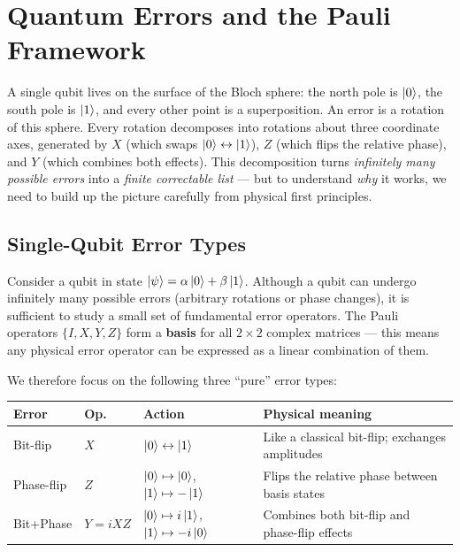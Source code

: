 \documentclass[11pt, a4paper]{article}
\theoremstyle{definition}
\theoremstyle{plain}
\theoremstyle{remark}
\begin{document}
\newpage
\section{Quantum Errors and the Pauli Framework}
\label{sec:errors}

\begin{intuition}
A single qubit lives on the surface of the Bloch sphere: the north pole is
$\ket{0}$, the south pole is $\ket{1}$, and every other point is a
superposition.  An error is a rotation of this sphere.  Every rotation
decomposes into rotations about three coordinate axes, generated by $X$
(which swaps $\ket{0}\leftrightarrow\ket{1}$), $Z$ (which flips the
relative phase), and $Y$ (which combines both effects).  This decomposition
turns \emph{infinitely many possible errors} into a \emph{finite correctable
list} --- but to understand \emph{why} it works, we need to build up the
picture carefully from physical first principles.
\end{intuition}

\subsection{Single-Qubit Error Types}

Consider a qubit in state $\ket{\psi} = \alpha\ket{0} + \beta\ket{1}$.
Although a qubit can undergo infinitely many possible errors (arbitrary
rotations or phase changes), it is sufficient to study a small set of
fundamental error operators.  The Pauli operators $\{I, X, Y, Z\}$ form
a \textbf{basis} for all $2\times2$ complex matrices --- this means any
physical error operator can be expressed as a linear combination of them.

We therefore focus on the following three ``pure'' error types:

\begin{center}
\renewcommand{\arraystretch}{1.4}
\begin{tabular}{@{} l l l p{5.5cm} @{}}
  \toprule
  \textbf{Error} & \textbf{Op.} & \textbf{Action} & \textbf{Physical meaning}\\
  \midrule
  Bit-flip   & $X$ & $\ket{0}\leftrightarrow\ket{1}$ &
      Like a classical bit-flip; exchanges amplitudes\\
  Phase-flip & $Z$ & $\ket{0}\mapsto\ket{0}$, $\ket{1}\mapsto{-}\ket{1}$ &
      Flips the relative phase between basis states\\
  Bit+Phase  & $Y{=}iXZ$ & $\ket{0}\mapsto i\ket{1}$, $\ket{1}\mapsto{-}i\ket{0}$ &
      Combines both bit-flip and phase-flip effects\\
  \bottomrule
\end{tabular}
\end{center}
\end{document}
